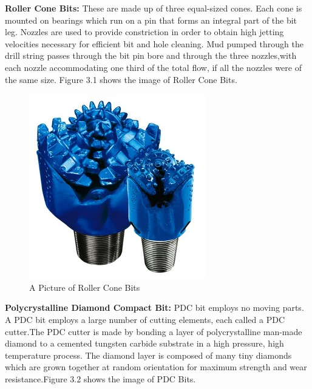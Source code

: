 \vspace{1em}

\textbf{Roller Cone Bits:} These are made up of three equal-sized cones. Each cone is 
mounted on bearings which run on a pin that forms an integral part of the bit leg.
Nozzles are used to provide constriction in order to obtain high jetting velocities 
necessary for efficient bit and hole cleaning. Mud pumped through the drill string passes 
through the bit pin bore and through the three nozzles,with each nozzle accommodating 
one third of the total flow, if all the nozzles were of the same size.
Figure 3.1 shows the image of Roller Cone Bits.

\vspace{1em}

\begin{figure}[h]
\includegraphics[scale=0.3]{images/Rollerconebits}
\centering 
\caption{A Picture of Roller Cone Bits}
\end{figure}

\textbf{Polycrystalline Diamond Compact Bit:} PDC bit employs no moving parts. 
A PDC bit employs a large number of cutting elements, each called a PDC cutter.The PDC cutter is made 
by bonding a layer of polycrystalline man-made diamond to a cemented tungsten 
carbide substrate in a high pressure, high temperature process. 
The diamond layer is composed of many tiny diamonds which are grown together at random orientation for 
maximum strength and wear resistance.Figure 3.2 shows the image of PDC Bits.

\vspace{1em}

